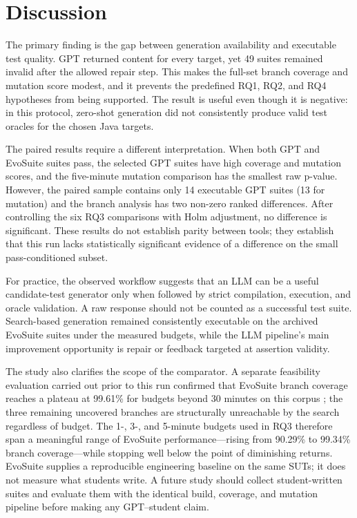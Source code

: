 \section{Discussion}
\label{sec:discussion}

The primary finding is the gap between generation availability and executable test quality. GPT returned content for every target, yet 49 suites remained invalid after the allowed repair step. This makes the full-set branch coverage and mutation score modest, and it prevents the predefined RQ1, RQ2, and RQ4 hypotheses from being supported. The result is useful even though it is negative: in this protocol, zero-shot generation did not consistently produce valid test oracles for the chosen Java targets.

The paired results require a different interpretation. When both GPT and EvoSuite suites pass, the selected GPT suites have high coverage and mutation scores, and the five-minute mutation comparison has the smallest raw p-value. However, the paired sample contains only 14 executable GPT suites (13 for mutation) and the branch analysis has two non-zero ranked differences. After controlling the six RQ3 comparisons with Holm adjustment, no difference is significant. These results do not establish parity between tools; they establish that this run lacks statistically significant evidence of a difference on the small pass-conditioned subset.

For practice, the observed workflow suggests that an LLM can be a useful candidate-test generator only when followed by strict compilation, execution, and oracle validation. A raw response should not be counted as a successful test suite. Search-based generation remained consistently executable on the archived EvoSuite suites under the measured budgets, while the LLM pipeline's main improvement opportunity is repair or feedback targeted at assertion validity.

The study also clarifies the scope of the comparator. A separate feasibility evaluation carried out prior to this run confirmed that EvoSuite branch coverage reaches a plateau at 99.61\% for budgets beyond 30 minutes on this corpus \cite{Lemieux_2023}; the three remaining uncovered branches are structurally unreachable by the search regardless of budget. The 1-, 3-, and 5-minute budgets used in RQ3 therefore span a meaningful range of EvoSuite performance---rising from 90.29\% to 99.34\% branch coverage---while stopping well below the point of diminishing returns. EvoSuite supplies a reproducible engineering baseline on the same SUTs; it does not measure what students write. A future study should collect student-written suites and evaluate them with the identical build, coverage, and mutation pipeline before making any GPT--student claim.

